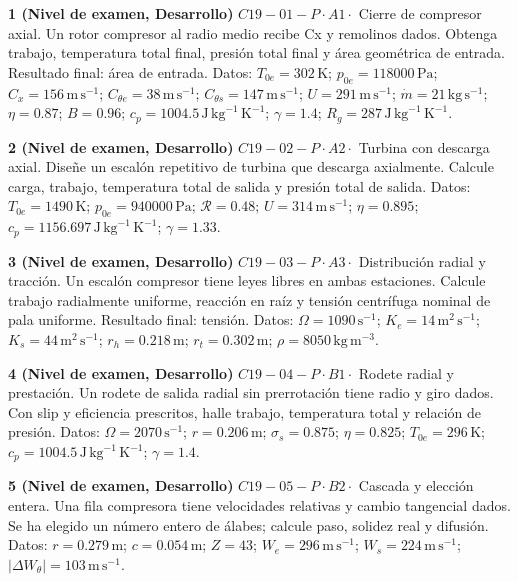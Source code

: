 \documentclass[10pt,openany]{book}
\begin{document}
\begin{tcolorbox}[title={Ejercicios propuestos}, studiumworked, breakable]

\noindent\textbf{1 (Nivel de examen, Desarrollo)}
\(C19-01-P \cdot A1 \cdot\) Cierre de compresor axial. Un rotor compresor al radio medio recibe Cx y remolinos dados. Obtenga trabajo, temperatura total final, presión total final y área geométrica de entrada. Resultado final: área de entrada. Datos: \(T_{0e}=302\, \mathrm{K}\); \(p_{0e}=118000\, \mathrm{Pa}\); \(C_x=156\, \mathrm{m}\,\mathrm{s}^{-1}\); \(C_{\theta e}=38\, \mathrm{m}\,\mathrm{s}^{-1}\); \(C_{\theta s}=147\, \mathrm{m}\,\mathrm{s}^{-1}\); \(U=291\, \mathrm{m}\,\mathrm{s}^{-1}\); \(\dot m=21\, \mathrm{kg}\,\mathrm{s}^{-1}\); \(\eta=0.87\); \(B=0.96\); \(c_p=1004.5\, \mathrm{J}\,\mathrm{kg}^{-1}\,\mathrm{K}^{-1}\); \(\gamma=1.4\); \(R_g=287\, \mathrm{J}\,\mathrm{kg}^{-1}\,\mathrm{K}^{-1}\).

\noindent\textbf{2 (Nivel de examen, Desarrollo)}
\(C19-02-P \cdot A2 \cdot\) Turbina con descarga axial. Diseñe un escalón repetitivo de turbina que descarga axialmente. Calcule carga, trabajo, temperatura total de salida y presión total de salida. Datos: \(T_{0e}=1490\, \mathrm{K}\); \(p_{0e}=940000\, \mathrm{Pa}\); \(\mathcal R=0.48\); \(U=314\, \mathrm{m}\,\mathrm{s}^{-1}\); \(\eta=0.895\); \(c_p=1156.697\, \mathrm{J}\,\mathrm{kg}^{-1}\,\mathrm{K}^{-1}\); \(\gamma=1.33\).

\noindent\textbf{3 (Nivel de examen, Desarrollo)}
\(C19-03-P \cdot A3 \cdot\) Distribución radial y tracción. Un escalón compresor tiene leyes libres en ambas estaciones. Calcule trabajo radialmente uniforme, reacción en raíz y tensión centrífuga nominal de pala uniforme. Resultado final: tensión. Datos: \(\Omega=1090\, \mathrm{s}^{-1}\); \(K_e=14\, \mathrm{m}^{2}\,\mathrm{s}^{-1}\); \(K_s=44\, \mathrm{m}^{2}\,\mathrm{s}^{-1}\); \(r_h=0.218\, \mathrm{m}\); \(r_t=0.302\, \mathrm{m}\); \(\rho=8050\, \mathrm{kg}\,\mathrm{m}^{-3}\).

\noindent\textbf{4 (Nivel de examen, Desarrollo)}
\(C19-04-P \cdot B1 \cdot\) Rodete radial y prestación. Un rodete de salida radial sin prerrotación tiene radio y giro dados. Con slip y eficiencia prescritos, halle trabajo, temperatura total y relación de presión. Datos: \(\Omega=2070\, \mathrm{s}^{-1}\); \(r=0.206\, \mathrm{m}\); \(\sigma_s=0.875\); \(\eta=0.825\); \(T_{0e}=296\, \mathrm{K}\); \(c_p=1004.5\, \mathrm{J}\,\mathrm{kg}^{-1}\,\mathrm{K}^{-1}\); \(\gamma=1.4\).

\noindent\textbf{5 (Nivel de examen, Desarrollo)}
\(C19-05-P \cdot B2 \cdot\) Cascada y elección entera. Una fila compresora tiene velocidades relativas y cambio tangencial dados. Se ha elegido un número entero de álabes; calcule paso, solidez real y difusión. Datos: \(r=0.279\, \mathrm{m}\); \(c=0.054\, \mathrm{m}\); \(Z=43\); \(W_e=296\, \mathrm{m}\,\mathrm{s}^{-1}\); \(W_s=224\, \mathrm{m}\,\mathrm{s}^{-1}\); \(|\Delta W_\theta|=103\, \mathrm{m}\,\mathrm{s}^{-1}\).


\end{tcolorbox}
\end{document}
